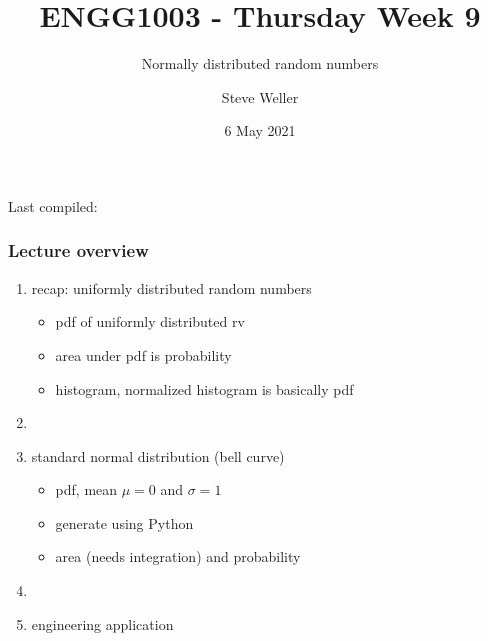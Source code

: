 \documentclass[english,14pt]{beamer}
\title{ENGG1003 - Thursday Week 9}
\subtitle{Normally distributed random numbers}
\author{Steve Weller}
\institute{University of Newcastle}
\date{6 May 2021}
\begin{document}
\begin{flushleft}
{\scriptsize Last compiled:~\DTMnow}
\vspace*{-5mm}
\end{flushleft}
\framebreak


\begin{frame}[fragile]

\frametitle{Lecture overview}
\begin{enumerate}
	\item recap: uniformly distributed random numbers
	\begin{itemize}
		\item pdf of uniformly distributed rv
		\item area under pdf is probability
		\item histogram, normalized histogram is basically pdf
	\end{itemize}

	\item[]
	
	\item standard normal distribution (bell curve)
	\begin{itemize}
		\item pdf, mean $\mu = 0$ and $\sigma = 1$ %
		\item generate using Python
		\item area (needs integration) and probability
	\end{itemize}
	
%	
	
	\item[]
	
	\item engineering application
	
\end{enumerate}

\end{frame}

\end{document}

